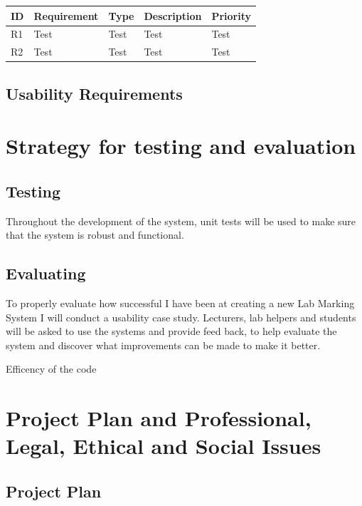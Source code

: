 \documentclass[12pt]{article}  %
\theoremstyle{definition}
\theoremstyle{remark}
\begin{document}
\begin{tabularx}{\textwidth}{|l|X|X|X|X|}
\hline
  \textbf{ID} & \textbf{Requirement} & \textbf{Type} & \textbf{Description} & \textbf{Priority} 
\\
\hline
R1&Test&Test&Test&Test\\ \hline
R2&Test&Test&Test&Test\\ \hline


\end{tabularx}

\subsection{Usability Requirements}







\newpage
\section{Strategy for testing and evaluation}

\subsection{Testing}
Throughout the development of the system, unit tests will be used to make sure that the system is robust and functional. \\

\subsection{Evaluating}
To properly evaluate how successful I have been at creating a new Lab Marking System I will conduct a usability case study. Lecturers, lab helpers and students will be asked to use the systems and provide feed back, to help evaluate the system and discover what improvements can be made to make it better.

Efficency of the code










\newpage
\section{Project Plan and Professional, Legal, Ethical and Social Issues}

\subsection{Project Plan}
\end{document}
